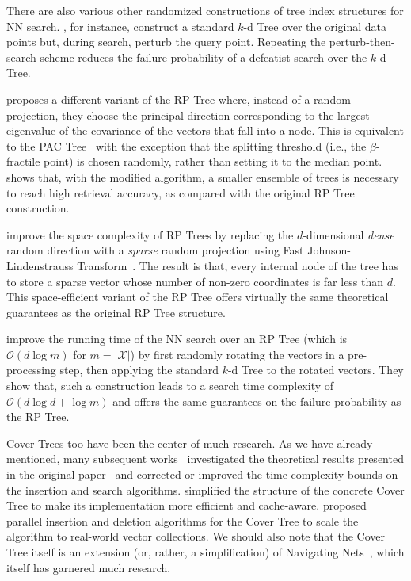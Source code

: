 \medskip

There are also various other randomized constructions of tree index structures
for NN search. \cite{panigrahy2008improved-kdtree}, for instance,
construct a standard $k$-d Tree over the original data points
but, during search, perturb the query point. Repeating the perturb-then-search
scheme reduces the failure probability of a defeatist search over the $k$-d Tree.

\cite{lshvsrptrees} proposes a different variant of the RP Tree where,
instead of a random projection, they choose the principal direction corresponding
to the largest eigenvalue of the covariance of the vectors that fall into a
node. This is equivalent to the PAC Tree~\citep{pactrees} with the exception
that the splitting threshold (i.e., the $\beta$-fractile point) is chosen randomly,
rather than setting it to the median point. \cite{lshvsrptrees} shows that,
with the modified algorithm, a smaller ensemble of trees is necessary to
reach high retrieval accuracy, as compared with the original RP Tree construction.

\cite{sparse-rp-trees} improve the space complexity
of RP Trees by replacing the $d$-dimensional \emph{dense} random direction
with a \emph{sparse} random projection using Fast Johnson-Lindenstrauss
Transform~\citep{fjlt}. The result is that, every internal node of the tree
has to store a sparse vector whose number of non-zero coordinates is far less
than $d$. This space-efficient variant of the RP Tree offers virtually the
same theoretical guarantees as the original RP Tree structure.

\cite{ram2019revisiting_kdtree} improve the running time of the
NN search over an RP Tree (which is $\mathcal{O}(d \log m)$ for $m = \lvert \mathcal{X} \rvert$)
by first randomly rotating the
vectors in a pre-processing step, then applying the standard $k$-d Tree to the
rotated vectors.
They show that, such a construction leads to a search time complexity of $\mathcal{O}(d\log d + \log m)$
and offers the same guarantees on the failure probability as the RP Tree.

\medskip

Cover Trees too have been the center of much research.
As we have already mentioned, many subsequent works~\citep{elkin2022counterexamples,elkin2023compressed-cover-trees,curtin2016phd} investigated
the theoretical results presented in the original paper~\citep{covertrees}
and corrected or improved the time complexity bounds on the insertion
and search algorithms.
\cite{faster-cover-trees} simplified the structure of the concrete Cover Tree
to make its implementation more efficient and cache-aware.
\cite{parallel-cover-trees} proposed parallel insertion and deletion
algorithms for the Cover Tree to scale the algorithm to real-world vector collections.
We should also note that the Cover Tree itself is an extension (or, rather,
a simplification) of Navigating Nets~\citep{krauthgamer2004navigatingnets},
which itself has garnered much research.

